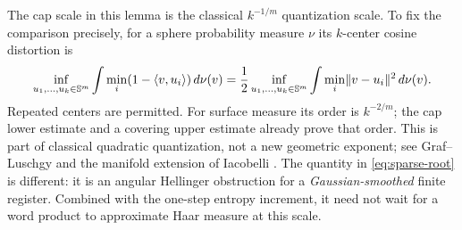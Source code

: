 The cap scale in this lemma is the classical $k^{-1/m}$ quantization
scale. To fix the comparison precisely, for a sphere probability
measure $\nu$ its $k$-center cosine distortion is
\[
 \inf_{u_1,\ldots,u_k\in\mathbb S^m}
 \int\min_i(1-\langle v,u_i\rangle)\,d\nu(v)
 =\frac12\inf_{u_1,\ldots,u_k\in\mathbb S^m}
 \int\min_i\lVert v-u_i\rVert^2\,d\nu(v).
\]
Repeated centers are permitted. For surface measure its order is
$k^{-2/m}$; the cap lower estimate and a covering upper estimate already
prove that order. This is part of classical quadratic quantization,
not a new geometric exponent; see Graf--Luschgy \cite{GL} and the
manifold extension of Iacobelli \cite[Theorem 1.4]{Iac}.
The quantity in \eqref{eq:sparse-root} is different: it is an angular
Hellinger obstruction for a \emph{Gaussian-smoothed} finite register.
Combined with the one-step entropy increment, it need not wait for a
word product to approximate Haar measure at this scale.
